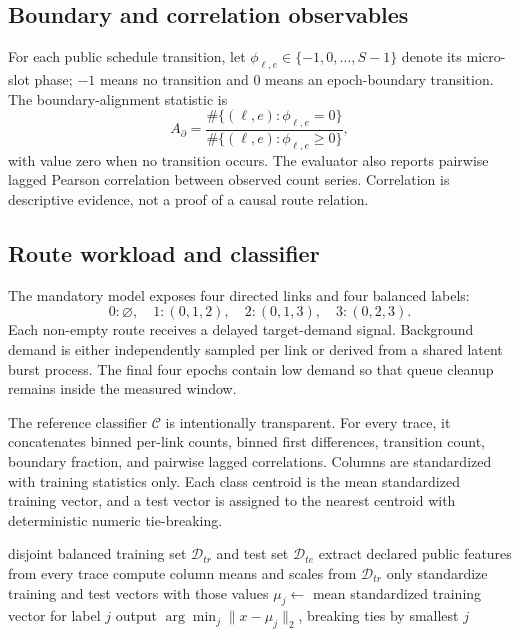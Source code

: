 \documentclass[11pt,oneside]{article}
\newcommand{\Tthree}{\ensuremath{\mathsf{T3}}}
\begin{document}
\subsection{Boundary and correlation observables}

For each public schedule transition, let $\phi_{\ell,e}\in\{-1,0,\ldots,S-1\}$ denote its micro-slot phase; $-1$ means no transition and $0$ means an epoch-boundary transition. The boundary-alignment statistic is
\begin{equation}
A_{\partial}=\frac{\#\{(\ell,e):\phi_{\ell,e}=0\}}
{\#\{(\ell,e):\phi_{\ell,e}\ge0\}},
\label{eq:t3boundary}
\end{equation}
with value zero when no transition occurs. The evaluator also reports pairwise lagged Pearson correlation between observed count series. Correlation is descriptive evidence, not a proof of a causal route relation.

\subsection{Route workload and classifier}

The mandatory model exposes four directed links and four balanced labels:
\begin{equation}
0:\varnothing,\quad 1:(0,1,2),\quad 2:(0,1,3),\quad 3:(0,2,3).
\label{eq:t3routes}
\end{equation}
Each non-empty route receives a delayed target-demand signal. Background demand is either independently sampled per link or derived from a shared latent burst process. The final four epochs contain low demand so that queue cleanup remains inside the measured window.

The reference classifier $\mathcal{C}$ is intentionally transparent. For every trace, it concatenates binned per-link counts, binned first differences, transition count, boundary fraction, and pairwise lagged correlations. Columns are standardized with training statistics only. Each class centroid is the mean standardized training vector, and a test vector is assigned to the nearest centroid with deterministic numeric tie-breaking.

\begin{algorithm}[ht]
\caption{Reference \Tthree{} route classifier}
\label{alg:t3classifier}
\begin{algorithmic}[1]
\Require disjoint balanced training set $\mathcal{D}_{tr}$ and test set $\mathcal{D}_{te}$
\State extract declared public features from every trace
\State compute column means and scales from $\mathcal{D}_{tr}$ only
\State standardize training and test vectors with those values
  \State $\mu_j\gets$ mean standardized training vector for label $j$
\EndFor
{}
  \State output $\arg\min_j\lVert x-\mu_j\rVert_2$, breaking ties by smallest $j$
\EndFor
\end{algorithmic}
\end{algorithm}
\end{document}
